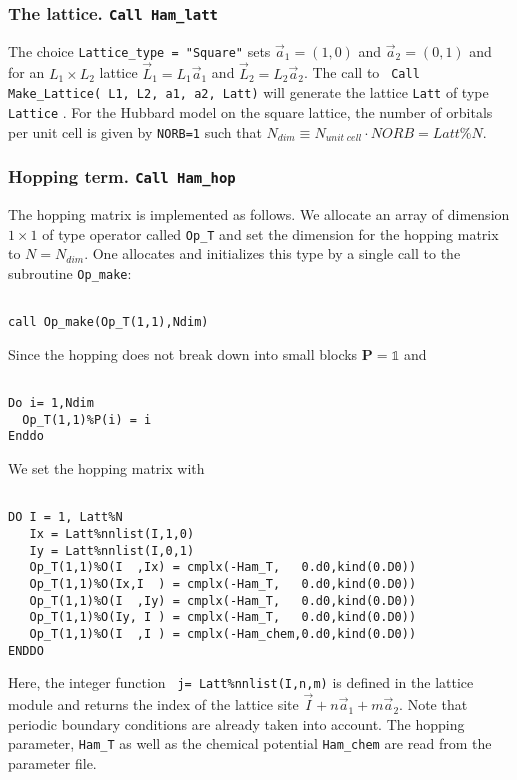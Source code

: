 \subsubsection{The lattice.   \texttt{Call Ham\_latt} }
The choice \texttt{Lattice\_type = "Square"} sets $\vec{a}_1 =  (1,0) $ and $\vec{a}_2 =  (0,1) $  and for an $L_1 \times L_2$  lattice  $\vec{L}_1 = L_1 \vec{a}_1$ and  $\vec{L}_2 = L_2 \vec{a}_2$.     The call to  \texttt{ Call Make\_Lattice( L1, L2, a1,  a2, Latt)} will generate the lattice   \texttt{Latt} of type \texttt{Lattice} . For the Hubbard model on the square lattice, the number of orbitals per unit cell is given by \texttt{NORB=1} such that   $N_{dim}   \equiv N_{unit\;cell}   \cdot NORB  =  Latt\%N$. 


\subsubsection{Hopping term. \texttt{Call Ham\_hop}}
The hopping matrix is implemented as follows. 
We allocate an array of dimension $1\times 1$ of type operator  called \texttt{Op\_T} and set the  dimension for the hopping  matrix to $N=N_{dim}$. One  allocates and initializes this type by a single call to the subroutine \texttt{Op\_make}: 
\begin{lstlisting}

call Op_make(Op_T(1,1),Ndim)

\end{lstlisting}
Since the hopping  does not  break down into small blocks ${\bm P}=\mathds{1}$   and  
\begin{lstlisting}

Do i= 1,Ndim
  Op_T(1,1)%P(i) = i
Enddo

\end{lstlisting}
We set the hopping matrix  with 
\begin{lstlisting}

DO I = 1, Latt%N
   Ix = Latt%nnlist(I,1,0)
   Iy = Latt%nnlist(I,0,1)
   Op_T(1,1)%O(I  ,Ix) = cmplx(-Ham_T,   0.d0,kind(0.D0))
   Op_T(1,1)%O(Ix,I  ) = cmplx(-Ham_T,   0.d0,kind(0.D0))
   Op_T(1,1)%O(I  ,Iy) = cmplx(-Ham_T,   0.d0,kind(0.D0))
   Op_T(1,1)%O(Iy, I ) = cmplx(-Ham_T,   0.d0,kind(0.D0))
   Op_T(1,1)%O(I  ,I ) = cmplx(-Ham_chem,0.d0,kind(0.D0))
ENDDO

\end{lstlisting}
Here,    the integer  function \texttt{  j=  Latt\%nnlist(I,n,m)}   is defined in the lattice module and returns the index of the lattice site $ \vec{I} +  n \vec{a}_1 +  m \vec{a}_2$. Note that periodic boundary conditions are 
already taken into account.  The hopping parameter, \texttt{Ham\_T} as well as the chemical potential \texttt{Ham\_chem} are read from the parameter file.  

